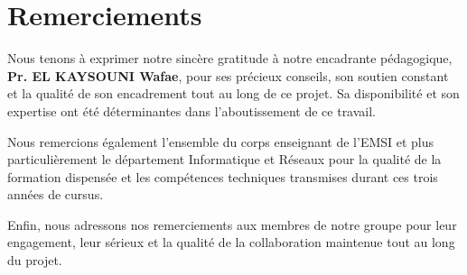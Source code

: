 
\chapter*{Remerciements}

Nous tenons à exprimer notre sincère gratitude à notre encadrante pédagogique, \textbf{Pr. EL KAYSOUNI Wafae}, pour ses précieux conseils, son soutien constant et la qualité de son encadrement tout au long de ce projet. Sa disponibilité et son expertise ont été déterminantes dans l'aboutissement de ce travail.

Nous remercions également l'ensemble du corps enseignant de l'EMSI et plus particulièrement le département Informatique et Réseaux pour la qualité de la formation dispensée et les compétences techniques transmises durant ces trois années de cursus.

Enfin, nous adressons nos remerciements aux membres de notre groupe pour leur engagement, leur sérieux et la qualité de la collaboration maintenue tout au long du projet.
